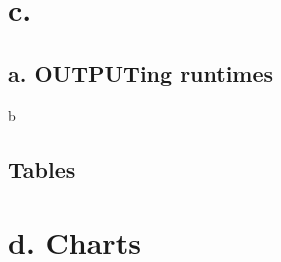 \documentclass[10pt, a4paper]{article}
\begin{document}
\begin{enumerate}
  \section{c. }
  \subsection{a. OUTPUTing runtimes}b

  \subsection{Tables}
  
  
    \section{d. Charts}
  
  

\end{enumerate}
\end{document}
